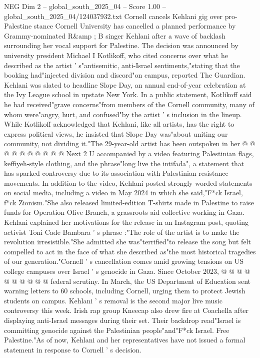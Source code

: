 \begin{textsample}{NEG Dim 2 – global\_south\_2025\_04 – Score 1.00 – global\_south\_2025\_04/124037932.txt}  \label{ex:f2_neg_174}
Cornell cancels Kehlani gig over pro-Palestine stance Cornell University has cancelled a planned performance by Grammy-nominated R\&amp ; B singer Kehlani after a wave of backlash surrounding her vocal support for Palestine.
The decision was announced by university president Michael I Kotlikoff, who cited concerns over what he described as the artist ' s"antisemitic, anti-Israel sentiments,"stating that the booking had"injected division and discord"on campus, reported The Guardian.
Kehlani was slated to headline Slope Day, an annual end-of-year celebration at the Ivy League school in upstate New York.
In a public statement, Kotlikoff said he had received"grave concerns"from members of the Cornell community, many of whom were"angry, hurt, and confused"by the artist ' s inclusion in the lineup.
While Kotlikoff acknowledged that Kehlani, like all artists, has the right to express political views, he insisted that Slope Day was"about uniting our community, not dividing it."The 29-year-old artist has been outspoken in her @ @ @ @ @ @ @ @ @ @ Next 2 U accompanied by a video featuring Palestinian flags, keffiyeh-style clothing, and the phrase"long live the intifada", a statement that has sparked controversy due to its association with Palestinian resistance movements.
In addition to the video, Kehlani posted strongly worded statements on social media, including a video in May 2024 in which she said,"F*ck Israel, f*ck Zionism."She also released limited-edition T-shirts made in Palestine to raise funds for Operation Olive Branch, a grassroots aid collective working in Gaza.
Kehlani explained her motivations for the release in an Instagram post, quoting activist Toni Cade Bambara ' s phrase :"The role of the artist is to make the revolution irresistible."She admitted she was"terrified"to release the song but felt compelled to act in the face of what she described as"the most historical tragedies of our generation."Cornell ' s cancellation comes amid growing tensions on US college campuses over Israel ' s genocide in Gaza.
Since October 2023, @ @ @ @ @ @ @ @ @ @ federal scrutiny.
In March, the US Department of Education sent warning letters to 60 schools, including Cornell, urging them to protect Jewish students on campus.
Kehlani ' s removal is the second major live music controversy this week.
Irish rap group Kneecap also drew fire at Coachella after displaying anti-Israel messages during their set.
Their backdrop read"Israel is committing genocide against the Palestinian people"and"F*ck Israel.
Free Palestine."As of now, Kehlani and her representatives have not issued a formal statement in response to Cornell ' s decision.

\end{textsample}
